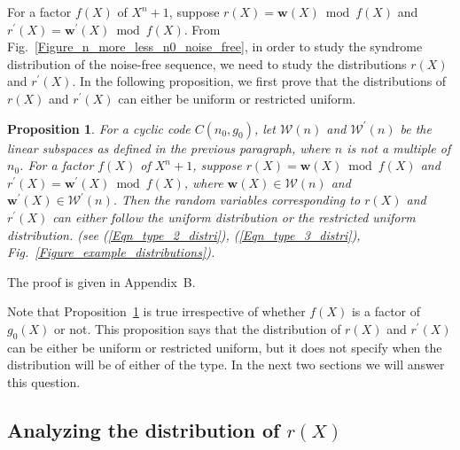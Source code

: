 \documentclass[10pt,journal]{IEEEtran}
\newtheorem{proposition}{Proposition}
\def \Fig {Fig.}
\begin{document}
For a factor $f(X)$ of $X^n+1$, suppose $r(X)=\mathbf{w}(X) \bmod f(X)$ and $r^{\prime}(X)=\mathbf{w}^{\prime}(X) \bmod f(X)$.
From \Fig~\ref{Figure_n_more_less_n0_noise_free}, in order to study the syndrome distribution of the noise-free sequence,
we need to study the distributions $r(X)$ and $r^{\prime}(X)$.
In the following proposition, we first prove that the distributions of $r(X)$ and $r^{\prime}(X)$ can 
either be uniform or restricted uniform.

% 
\begin{proposition}
\label{Proposition_cyclic_structure_no_type1}
%  
For a cyclic code $C(n_0,g_0)$, let $\mathcal{W}(n)$ and $\mathcal{W}^{\prime}(n)$ be the linear subspaces
as defined in the previous paragraph, where $n$ is not a multiple of $n_0$.
For a factor $f(X)$ of $X^n+1$, suppose $r(X) = \mathbf{w}(X) \bmod f(X)$
and $r^{\prime}(X) = \mathbf{w}^{\prime}(X) \bmod f(X)$, where $\mathbf{w}(X) \in \mathcal{W}(n)$ 
and $\mathbf{w}^{\prime}(X) \in \mathcal{W}^{\prime}(n)$.
Then the random variables corresponding to $r(X)$ and $r^{\prime}(X)$ can either follow the uniform distribution or the restricted uniform distribution.
(see (\ref{Eqn_type_2_distri}), (\ref{Eqn_type_3_distri}), \Fig~\ref{Figure_example_distributions}).
% 
\end{proposition}
% 
\begin{IEEEproof}
%  
The proof is given in Appendix~B.
% 
\end{IEEEproof}
% 

Note that Proposition~\ref{Proposition_cyclic_structure_no_type1} is true irrespective of whether $f(X)$ is a factor of $g_0(X)$ or not.
This proposition says that the distribution of $r(X)$ and $r^{\prime}(X)$
can be either be uniform or restricted uniform, but it does not specify when the distribution will be of either of the type.
In the next two sections we will answer this question.

\subsection{Analyzing the distribution of $r(X)$}
\label{SubSection_cyclic_strure_w_consecutive_n_bits}
\end{document}
